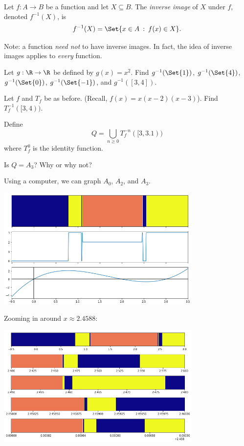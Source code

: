 	\newpage
	\begin{definition}
		Let $f:A\to B$ be a function and let $X\subseteq B$. The \emph{inverse image} of $X$
		under $f$, denoted $f^{-1}(X)$, is
		\[
			f^{-1}(X)=\Set{x\in A\given f(x)\in X}.
		\]
	\end{definition}
	Note: a function \emph{need not} to have inverse images. In fact, the idea of inverse images applies
	to \emph{every} function.

	\question
	\begin{parts}
		\item Let $g:\R\to\R$ be defined by $g(x)=x^2$. Find $g^{-1}(\Set{1})$,
			$g^{-1}(\Set{4})$, $g^{-1}(\Set{0})$, $g^{-1}(\Set{-1})$, and $g^{-1}([3,4])$.
		\item Let $f$ and $T_f$ be as before. (Recall, $f(x)=x(x-2)(x-3)$). Find $T_f^{-1}([3,4))$.
		\item Define
			\[
				Q=\bigcup_{n\geq 0} T_f^{-n}([3,3.1))
			\]
			where $T_f^0$ is the identity function.

			Is $Q=A_3$? Why or why not?
	\end{parts}

	Using a computer, we can graph $A_0$, $A_2$, and $A_3$.

	\begin{center}
	\includegraphics[width=4in]{images/newt1.png}
	\end{center}
	
	Zooming in around $x\approx 2.4588$:

	\begin{center}
	\includegraphics[width=4in]{images/newt2.png}
	\end{center}

